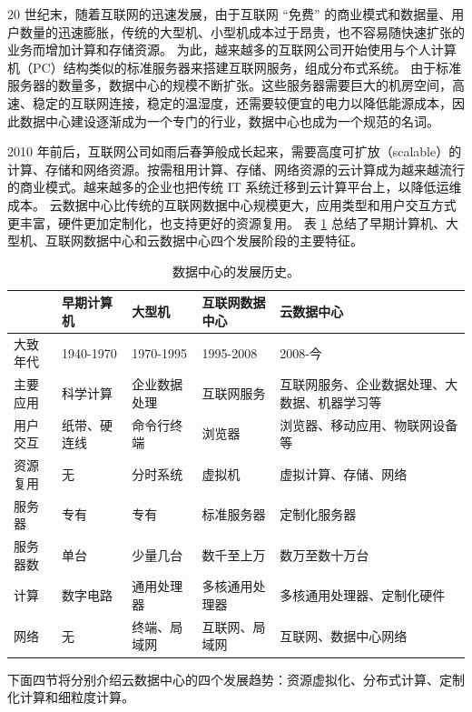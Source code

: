 20 世纪末，随着互联网的迅速发展，由于互联网 ``免费'' 的商业模式和数据量、用户数量的迅速膨胀，传统的大型机、小型机成本过于昂贵，也不容易随快速扩张的业务而增加计算和存储资源。
为此，越来越多的互联网公司开始使用与个人计算机（PC）结构类似的标准服务器来搭建互联网服务，组成分布式系统。
由于标准服务器的数量多，数据中心的规模不断扩张。这些服务器需要巨大的机房空间，高速、稳定的互联网连接，稳定的温湿度，还需要较便宜的电力以降低能源成本，因此数据中心建设逐渐成为一个专门的行业，数据中心也成为一个规范的名词。

2010 年前后，互联网公司如雨后春笋般成长起来，需要高度可扩放（scalable）的计算、存储和网络资源。按需租用计算、存储、网络资源的云计算成为越来越流行的商业模式。越来越多的企业也把传统 IT 系统迁移到云计算平台上，以降低运维成本。
云数据中心比传统的互联网数据中心规模更大，应用类型和用户交互方式更丰富，硬件更加定制化，也支持更好的资源复用。
表 \ref{background:tab:datacenter} 总结了早期计算机、大型机、互联网数据中心和云数据中心四个发展阶段的主要特征。



\begin{table}[htbp]
	\centering
	\caption{数据中心的发展历史。}
	\small
	\begin{tabular}{l|p{}|p{}|p{}|p{}}
		\hline
		 & 早期计算机 & 大型机 & 互联网数据中心 & 云数据中心 \\
		\hline
		\hline
		大致年代 & 1940-1970 & 1970-1995 & 1995-2008 & 2008-今 \\
		\hline
		主要应用 & 科学计算 & 企业数据处理 & 互联网服务 & 互联网服务、企业数据处理、大数据、机器学习等 \\
		\hline
		用户交互 & 纸带、硬连线 & 命令行终端 & 浏览器 & 浏览器、移动应用、物联网设备等 \\
		\hline
		资源复用 & 无 & 分时系统 & 虚拟机 & 虚拟计算、存储、网络 \\
		\hline
		服务器 & 专有 & 专有 & 标准服务器 & 定制化服务器 \\
		\hline
		服务器数 & 单台 & 少量几台 & 数千至上万 & 数万至数十万台 \\
		\hline
		计算 & 数字电路 & 通用处理器 & 多核通用处理器 & 多核通用处理器、定制化硬件 \\
		\hline
		网络 & 无 & 终端、局域网 & 互联网、局域网 & 互联网、数据中心网络 \\
		\hline
	\end{tabular}
	\label{background:tab:datacenter}
\end{table}

下面四节将分别介绍云数据中心的四个发展趋势：资源虚拟化、分布式计算、定制化计算和细粒度计算。

